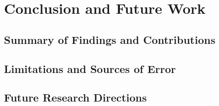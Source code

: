 \chapter{Conclusion and Future Work}

\section{Summary of Findings and Contributions}

\section{Limitations and Sources of Error}

\section{Future Research Directions}

